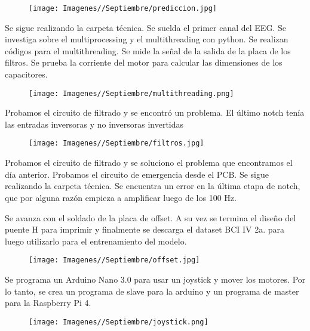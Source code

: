 \documentclass{article}
\begin{document}
\begin{figure}[H]
    \centering
    \texttt{[image: Imagenes//Septiembre/prediccion.jpg]}
\end{figure}

\newpage
Se sigue realizando la carpeta técnica. Se suelda el primer canal del EEG. Se investiga sobre el multiprocessing y el multithreading con python. Se realizan códigos para el multithreading. Se mide la señal de la salida de la placa de los filtros. Se prueba la corriente del motor para calcular las dimensiones de los capacitores.

\begin{figure}[H]
    \centering
    \texttt{[image: Imagenes//Septiembre/multithreading.png]}
\end{figure}

Probamos el circuito de filtrado y se encontró un problema. El último notch tenía las entradas inversoras y no inversoras invertidas

\begin{figure}[H]
    \centering
    \texttt{[image: Imagenes//Septiembre/filtros.jpg]}
\end{figure}

Probamos el circuito de filtrado y se soluciono el problema que encontramos el día anterior. Probamos el circuito de emergencia desde el PCB. Se sigue realizando la carpeta técnica. Se encuentra un error en la última etapa de notch, que por alguna razón empieza a amplificar luego de los 100 Hz.



Se avanza con el soldado de la placa de offset. A su vez se termina el diseño del puente H para imprimir y finalmente se descarga el dataset BCI IV 2a. para luego utilizarlo para el entrenamiento del modelo.

\begin{figure}[H]
    \centering
    \texttt{[image: Imagenes//Septiembre/offset.jpg]}
\end{figure}

Se programa un Arduino Nano 3.0 para usar un joystick y mover los motores. Por lo tanto, se crea un programa de slave para la arduino y un programa de master para la Raspberry Pi 4.

\begin{figure}[H]
    \centering
    \texttt{[image: Imagenes//Septiembre/joystick.png]}
\end{figure}
\end{document}
